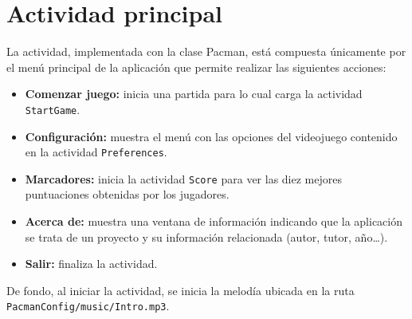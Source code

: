 \section{Actividad principal}
La actividad, implementada con la clase Pacman, está compuesta únicamente por el menú principal de la aplicación que permite realizar las siguientes acciones:
\begin{itemize}
\item \textbf{Comenzar juego:} inicia una partida para lo cual carga la actividad \texttt{StartGame}.
\item \textbf{Configuración:} muestra el menú con las opciones del videojuego contenido en la actividad \texttt{Preferences}.
\item \textbf{Marcadores:} inicia la actividad \texttt{Score} para ver las diez mejores puntuaciones obtenidas por los jugadores.
\item \textbf{Acerca de:} muestra una ventana de información indicando que la aplicación se trata de un proyecto y su información relacionada (autor,  tutor, año\ldots).
\item \textbf{Salir:} finaliza la actividad.
\end{itemize}

De fondo, al iniciar la actividad, se inicia la melodía ubicada en la ruta \texttt{PacmanConfig/music/Intro.mp3}.

